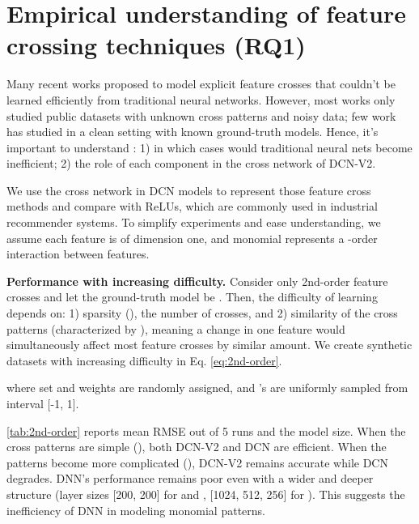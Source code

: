 \documentclass[sigconf]{acmart}
\begin{document}
\section{Empirical understanding of feature crossing techniques (RQ1)}
\label{sec:exp_synthetic}
Many recent works \cite{wang2017deep, cheng2016wide, guo2017deepfm, beutel2018latent, qu2016product, lian2018xdeepfm, naumov2019deep} proposed to model explicit feature crosses that couldn't be learned efficiently from traditional neural networks. However, most works only studied public datasets with unknown cross patterns and noisy data; few work has studied in a clean setting with known ground-truth models. Hence, it's important to understand : 1) in which cases would traditional neural nets become inefficient; 2) the role of each component in the cross network of {DCN-V2}.

We use the cross network in DCN models to represent those feature cross methods and compare with ReLUs, which are commonly used in industrial recommender systems.
To simplify experiments and ease understanding, we assume each feature  is of dimension one, and monomial  represents a -order interaction between features. 

{\bf Performance with increasing difficulty.}
Consider only 2nd-order feature crosses and let the ground-truth model be .
Then, the difficulty of learning  depends on: 1) sparsity (), the number of crosses, and 2) similarity of the cross patterns (characterized by ), meaning a change in one feature would simultaneously affect most feature crosses by similar amount. We create synthetic datasets with increasing difficulty in Eq. \eqref{eq:2nd-order}.

where set  and weights  are randomly assigned, and 's are uniformly sampled from interval [-1, 1].

\autoref{tab:2nd-order} reports mean RMSE out of 5 runs and the model size. When the cross patterns are simple (), both {DCN-V2} and DCN are efficient. When the patterns become more complicated (), {DCN-V2} remains accurate while DCN degrades. DNN's performance remains poor even with a wider and deeper structure (layer sizes [200, 200] for  and , [1024, 512, 256] for ). This suggests the inefficiency of DNN in modeling monomial patterns. 
\end{document}
